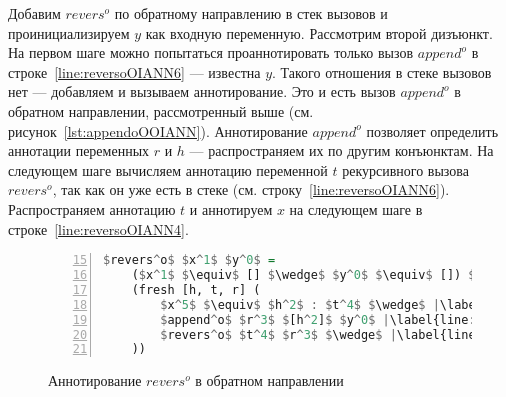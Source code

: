 Добавим $revers^o$ по обратному направлению в стек вызовов и проинициализируем $y$ как входную переменную.
Рассмотрим второй дизъюнкт.
На первом шаге можно попытаться проаннотировать только вызов $append^o$ в строке~\ref{line:reversoOIANN6} --- известна $y$.
Такого отношения в стеке вызовов нет --- добавляем и вызываем аннотирование.
Это и есть вызов $append^o$ в обратном направлении, рассмотренный выше (см. рисунок~\ref{lst:appendoOOIANN}).
Аннотирование $append^o$ позволяет определить аннотации переменных $r$ и $h$ --- распространяем их по другим конъюнктам.
На следующем шаге вычисляем аннотацию переменной $t$ рекурсивного вызова $revers^o$, так как он уже есть в стеке (см. строку~\ref{line:reversoOIANN6}).
Распространяем аннотацию $t$ и аннотируем $x$ на следующем шаге в строке~\ref{line:reversoOIANN4}.

\begin{figure}[h!]
  \begin{center}
  \begin{minipage}{0.4\textwidth}
  \begin{lstlisting}[language=Haskell, frame=single, numbers=left,numberstyle=\small, firstnumber=15, escapechar=|]
  $revers^o$ $x^1$ $y^0$ =
    ($x^1$ $\equiv$ [] $\wedge$ $y^0$ $\equiv$ []) $\vee$ |\label{line:reversoOIANN2}|
    (fresh [h, t, r] (
        $x^5$ $\equiv$ $h^2$ : $t^4$ $\wedge$ |\label{line:reversoOIANN4}|
        $append^o$ $r^3$ $[h^2]$ $y^0$ |\label{line:reversoOIANN5}|
        $revers^o$ $t^4$ $r^3$ $\wedge$ |\label{line:reversoOIANN6}|
    ))
    \end{lstlisting}
  \end{minipage}
  \end{center}
  \caption{Аннотирование $revers^o$ в обратном направлении}
  \label{lst:reversoOIANN}
\end{figure}
